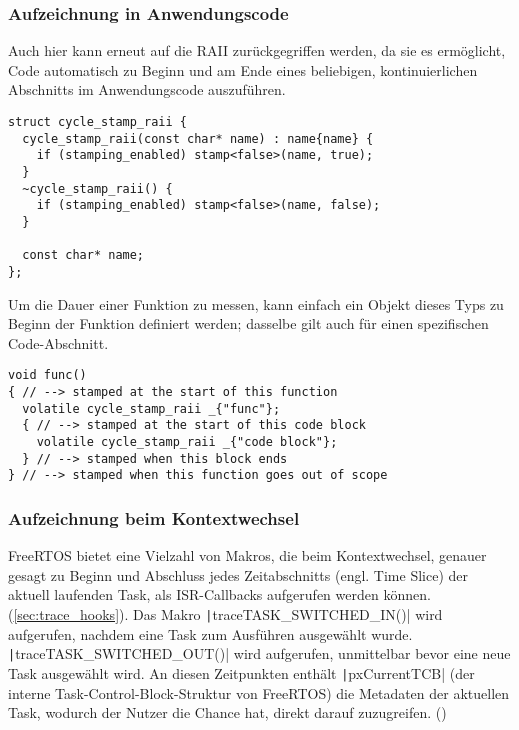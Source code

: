 \subsubsection{Aufzeichnung in Anwendungscode}

Auch hier kann erneut auf die RAII zurückgegriffen werden, da sie es ermöglicht,
Code automatisch zu Beginn und am Ende eines beliebigen, kontinuierlichen
Abschnitts im Anwendungscode auszuführen.

\begin{code}
\begin{verbatim}
struct cycle_stamp_raii {
  cycle_stamp_raii(const char* name) : name{name} {
    if (stamping_enabled) stamp<false>(name, true);
  }
  ~cycle_stamp_raii() {
    if (stamping_enabled) stamp<false>(name, false);
  }

  const char* name;
};
\end{verbatim}
\end{code}

Um die Dauer einer Funktion zu messen, kann einfach ein Objekt dieses Typs zu
Beginn der Funktion definiert werden; dasselbe gilt auch für einen spezifischen
Code-Abschnitt.

\begin{code}
\begin{verbatim}
void func()
{ // --> stamped at the start of this function
  volatile cycle_stamp_raii _{"func"};
  { // --> stamped at the start of this code block
    volatile cycle_stamp_raii _{"code block"};
  } // --> stamped when this block ends
} // --> stamped when this function goes out of scope
\end{verbatim}
\end{code}

\subsubsection{Aufzeichnung beim Kontextwechsel}

FreeRTOS bietet eine Vielzahl von Makros, die beim Kontextwechsel, genauer
gesagt zu Beginn und Abschluss jedes Zeitabschnitts (engl. Time Slice) der
aktuell laufenden Task, als ISR-Callbacks aufgerufen werden
können.(\ref{sec:trace_hooks}). Das Makro
\texttt|traceTASK_SWITCHED_IN()| wird aufgerufen, nachdem eine Task zum
Ausführen ausgewählt wurde. \texttt|traceTASK_SWITCHED_OUT()| wird
aufgerufen, unmittelbar bevor eine neue Task ausgewählt wird. An diesen
Zeitpunkten enthält \texttt|pxCurrentTCB| (der interne
Task-Control-Block-Struktur von FreeRTOS) die Metadaten der aktuellen Task,
wodurch der Nutzer die Chance hat, direkt darauf zuzugreifen.
(\cite{freertos_rtos_trace_hooks})

